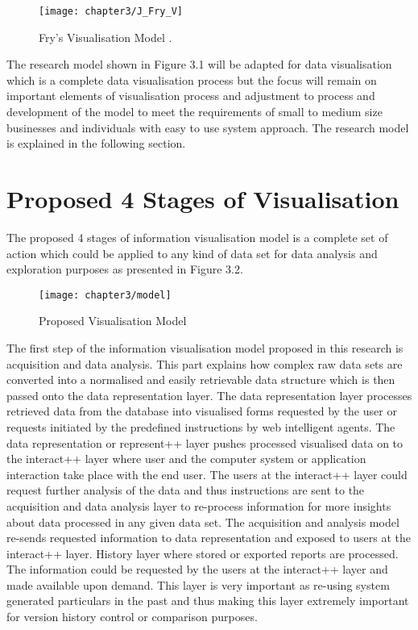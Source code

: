 \begin{figure}[H]
\centering
\texttt{[image: chapter3/J\_Fry\_V]}
\caption{Fry's Visualisation Model \cite{fry}.}
\end{figure} 

The research model shown in Figure 3.1 will be adapted for data visualisation which is a complete data visualisation process but the focus will remain on important elements of visualisation process and adjustment to process and development of the model to meet the requirements of small to medium size businesses and individuals with easy to use system approach. The research model is explained in the following section.

\section{Proposed 4 Stages of Visualisation}

The proposed 4 stages of information visualisation model is a complete set of action which could be applied to any kind of data set for data analysis and exploration purposes as presented in Figure 3.2.  

\begin{figure}[H]
\centering
\texttt{[image: chapter3/model]}
\caption{Proposed Visualisation Model}
\end{figure} 

The first step of the information visualisation model proposed in this research is acquisition and data analysis. This part explains how complex raw data sets are converted into a normalised and easily retrievable data structure which is then passed onto the data representation layer. The data representation layer processes retrieved data from the database into visualised forms requested by the user or requests initiated by the predefined instructions by web intelligent agents. The data representation or represent++ layer pushes processed visualised data on to the interact++ layer where user and the computer system or application interaction take place with the end user. The users at the interact++ layer could request further analysis of the data and thus instructions are sent to the acquisition and data analysis layer to re-process information for more insights about data processed in any given data set. The acquisition and analysis model re-sends requested information to data representation and exposed to users at the interact++ layer. History layer where stored or exported reports are processed. The information could be requested by the users at the interact++ layer and made available upon demand. This layer is very important as re-using system generated particulars in the past and thus making this layer extremely important for version history control or comparison purposes.\\

